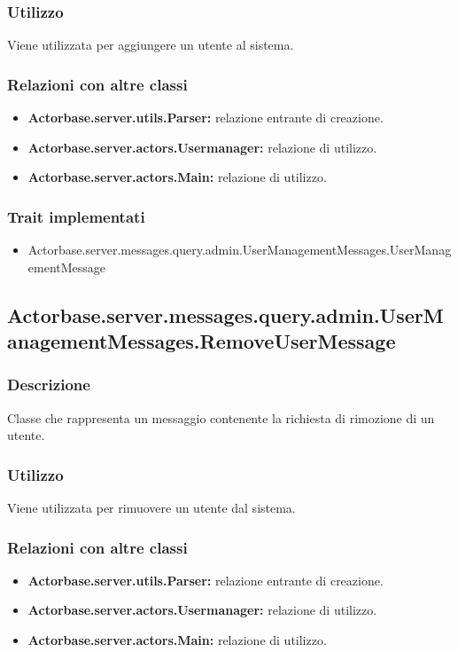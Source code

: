 \documentclass[a4paper]{article}
\begin{document}
			\subsubsection{Utilizzo}
				Viene utilizzata per aggiungere un utente al sistema.
				
			\subsubsection{Relazioni con altre classi}
				\begin{itemize}
					\item \textbf{Actorbase.server.utils.Parser:} relazione entrante di creazione.
					\item \textbf{Actorbase.server.actors.Usermanager:} relazione di utilizzo.
					\item \textbf{Actorbase.server.actors.Main:} relazione di utilizzo.
				\end{itemize}
			\subsubsection{Trait implementati}
				\begin{itemize}
					\item Actorbase.server.messages.query.admin.UserManagementMessages.UserManagementMessage
				\end{itemize}
		
		\subsection{Actorbase.server.messages.query.admin.UserManagementMessages.RemoveUserMessage}
			\subsubsection{Descrizione}
				Classe che rappresenta un messaggio contenente la richiesta di rimozione di un utente.
				
			\subsubsection{Utilizzo}
				Viene utilizzata per rimuovere un utente dal sistema.
				
			\subsubsection{Relazioni con altre classi}
				\begin{itemize}
					\item \textbf{Actorbase.server.utils.Parser:} relazione entrante di creazione.
					\item \textbf{Actorbase.server.actors.Usermanager:} relazione di utilizzo.
					\item \textbf{Actorbase.server.actors.Main:} relazione di utilizzo.
				\end{itemize}
\end{document}
